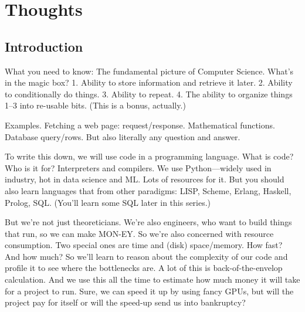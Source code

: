 \chapter{Thoughts}

\section{Introduction}
What you need to know: The fundamental picture of Computer Science. What's in the magic box? 1. Ability to store information and retrieve it later. 2. Ability to conditionally do things. 3. Ability to repeat. 4. The ability to organize things 1--3 into re-usable bits. (This is a bonus, actually.)

Examples. Fetching a web page: request/response. Mathematical functions. Database query/rows. But also literally any question and answer.

To write this down, we will use code in a programming language. What is code? Who is it for? Interpreters and compilers. We use Python---widely used in industry, hot in data science and ML. Lots of resources for it. But you should also learn languages that from other paradigms: LISP, Scheme, Erlang, Haskell, Prolog, SQL. (You'll learn some SQL later in this series.)

But we're not just theoreticians. We're also engineers, who want to build things that run, so we can make MON-EY. So we're also concerned with resource consumption. Two special ones are time and (disk) space/memory. How fast? And how much? So we'll learn to reason about the complexity of our code and profile it to see where the bottlenecks are. A lot of this is back-of-the-envelop calculation. And we use this all the time to estimate how much money it will take for a project to run. Sure, we can speed it up by using fancy GPUs, but will the project pay for itself or will the speed-up send us into bankruptcy?

